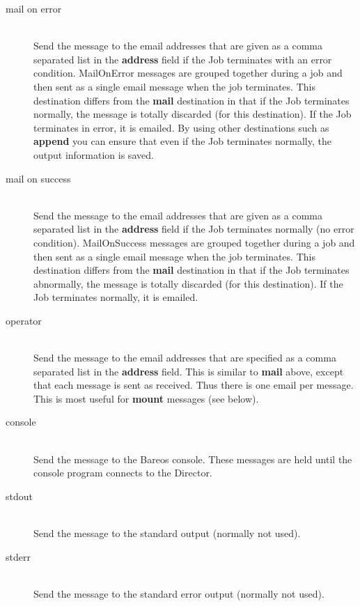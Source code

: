 \begin{description}
\begin{description}
\item [mail on error] \hfill \\
Send the message to the email addresses that are given as a comma
separated list in the {\bf address} field if the Job terminates with an
error condition.  MailOnError messages are grouped together during a job
and then sent as a single email message when the job terminates.  This
destination differs from the {\bf mail} destination in that if the Job
terminates normally, the message is totally discarded (for this
destination).  If the Job terminates in error, it is emailed.  By using
other destinations such as {\bf append} you can ensure that even if the
Job terminates normally, the output information is saved.

\item [mail on success] \hfill \\
Send the message to the email addresses that are given as a comma
separated list in the {\bf address} field if the Job terminates
normally (no error condition).  MailOnSuccess messages are grouped
together during a job and then sent as a single email message when the
job terminates.  This destination differs from the {\bf mail}
destination in that if the Job terminates abnormally, the message is
totally discarded (for this destination).  If the Job terminates
normally, it is emailed.

\item [operator] \hfill \\
Send the message to the email addresses that are specified as a comma
separated list in the {\bf address} field.  This is similar to {\bf
mail} above, except that each message is sent as received.  Thus there
is one email per message.  This is most useful for {\bf mount} messages
(see below).

\item [console] \hfill \\
  Send the message to the Bareos console. These messages are held
  until the console program  connects to the Director.

\item [stdout] \hfill \\
  Send the message to the standard output (normally not used).

\item [stderr] \hfill \\
  Send the message to the standard error output (normally not used).


\end{description}
\end{description}
